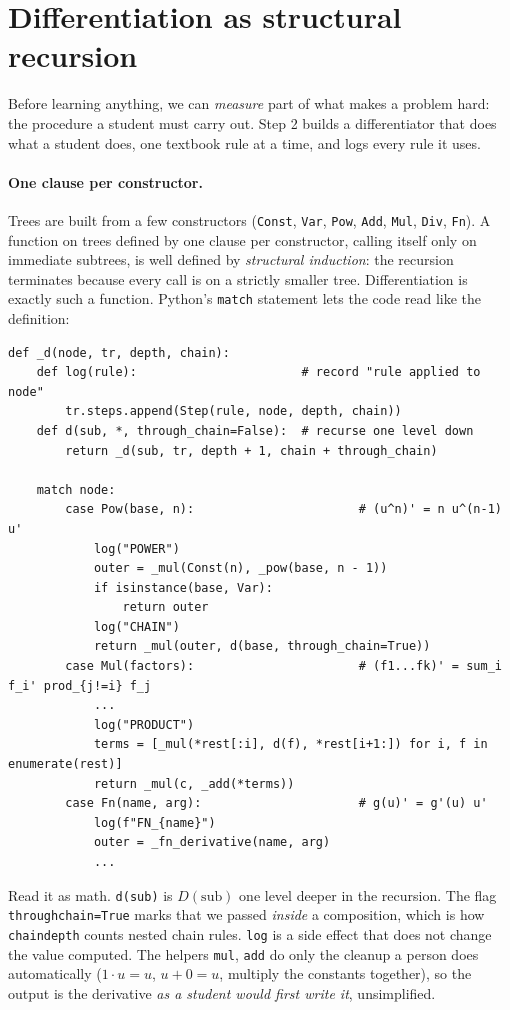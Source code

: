 \documentclass[11pt]{article}
\theoremstyle{definition}
\theoremstyle{plain}
\theoremstyle{remark}
\newcommand{\code}[1]{\texttt{#1}}
\renewcommand{\_}{\oldunderscore\allowbreak}
\newcommand{\file}[1]{\textcolor{blue!50!black}{\texttt{#1}}}
\newcommand{\codefrom}[1]{\par\smallskip\noindent{\footnotesize\textbf{From} \file{#1}}}
\begin{document}
\section{Differentiation as structural recursion}
\label{sec:trace}

Before learning anything, we can \emph{measure} part of what makes a problem hard: the
procedure a student must carry out. Step 2 builds a differentiator that does what
a student does, one textbook rule at a time, and logs every rule it uses.

\paragraph{One clause per constructor.}
Trees are built from a few constructors (\code{Const}, \code{Var}, \code{Pow}, \code{Add},
\code{Mul}, \code{Div}, \code{Fn}). A function on trees defined by one clause per constructor,
calling itself only on immediate subtrees, is well defined by \emph{structural induction}:
the recursion terminates because every call is on a strictly smaller tree. Differentiation
is exactly such a function. Python's \code{match} statement lets the code read like the
definition:

\codefrom{src/calcdiff/solver\_trace.py}
\begin{lstlisting}
def _d(node, tr, depth, chain):
    def log(rule):                       # record "rule applied to node"
        tr.steps.append(Step(rule, node, depth, chain))
    def d(sub, *, through_chain=False):  # recurse one level down
        return _d(sub, tr, depth + 1, chain + through_chain)

    match node:
        case Pow(base, n):                       # (u^n)' = n u^(n-1) u'
            log("POWER")
            outer = _mul(Const(n), _pow(base, n - 1))
            if isinstance(base, Var):
                return outer
            log("CHAIN")
            return _mul(outer, d(base, through_chain=True))
        case Mul(factors):                       # (f1...fk)' = sum_i f_i' prod_{j!=i} f_j
            ...
            log("PRODUCT")
            terms = [_mul(*rest[:i], d(f), *rest[i+1:]) for i, f in enumerate(rest)]
            return _mul(c, _add(*terms))
        case Fn(name, arg):                      # g(u)' = g'(u) u'
            log(f"FN_{name}")
            outer = _fn_derivative(name, arg)
            ...
\end{lstlisting}
Read it as math. \code{d(sub)} is $D(\text{sub})$ one level deeper in the recursion. The flag
\code{through\_chain=True} marks that we passed \emph{inside} a composition, which is how
\code{chain\_depth} counts nested chain rules. \code{log} is a side effect that does not change the
value computed. The helpers \code{\_mul}, \code{\_add} do only the cleanup a person does
automatically ($1\cdot u=u$, $u+0=u$, multiply the constants together), so the output is the
derivative \emph{as a student would first write it}, unsimplified.
\end{document}
